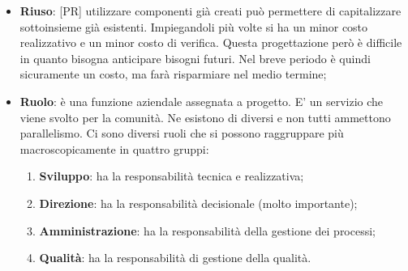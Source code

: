 \begin{itemize}
	\item \textbf{Riuso}: [PR] utilizzare componenti già creati può permettere di capitalizzare sottoinsieme già esistenti. Impiegandoli più volte si ha un minor costo realizzativo e un minor costo di verifica. Questa progettazione però è difficile in quanto bisogna anticipare bisogni futuri. Nel breve periodo è quindi sicuramente un costo, ma farà risparmiare nel medio termine;

	\item \textbf{Ruolo}: è una funzione aziendale assegnata a progetto. E' un servizio che viene svolto per la comunità. Ne esistono di diversi e non tutti ammettono parallelismo. \newline
	Ci sono diversi ruoli che si possono raggruppare più macroscopicamente in quattro gruppi:
	\begin{enumerate}
		\item \textbf{Sviluppo}: ha la responsabilità tecnica e realizzativa;
		\item \textbf{Direzione}: ha la responsabilità decisionale (molto importante);
		\item \textbf{Amministrazione}: ha la responsabilità della gestione dei processi;
		\item \textbf{Qualità}: ha la responsabilità di gestione della qualità.
	\end{enumerate}

\end{itemize}
